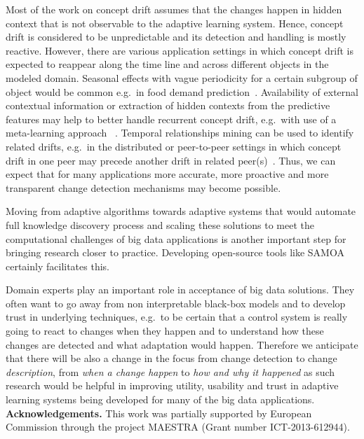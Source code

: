 \documentclass{llncs}
\begin{document}
Most of the work on concept drift assumes that the changes happen in hidden context that is not observable to the adaptive learning system. Hence, concept drift is considered to be unpredictable and its detection and handling is mostly reactive.
However, there are various application settings in which concept drift is expected to reappear along the time line and across different objects in the modeled domain. Seasonal effects with vague periodicity for a certain subgroup of object would be common e.g.\ in food demand prediction~\cite{Zliobaite11sligro}.
Availability of external contextual information or extraction of hidden contexts from the predictive features may help to better handle recurrent concept drift, e.g.\ with use of a meta-learning approach ~\cite{GamaK11}. Temporal relationships mining can be used to identify related drifts, e.g.\ in the distributed or peer-to-peer settings in which concept drift in one peer may precede another drift in related peer(s)~\cite{Ang2013}.
Thus, we can expect that for many applications more accurate, more proactive and more transparent change detection mechanisms may become possible.


Moving from adaptive algorithms towards adaptive systems that would automate full knowledge discovery process and scaling these solutions to meet the computational challenges of big data applications is another important step for bringing research closer to practice. Developing open-source tools like SAMOA~\cite{JMLR:v16:morales15a} certainly facilitates this.

Domain experts play an important role in acceptance of big data solutions. They often want to go away from non interpretable black-box models and to develop trust in underlying techniques, e.g.\ to be certain that a control system is really going to react to changes when they happen and to understand how these changes are detected and what adaptation would happen.
Therefore we anticipate that there will be also a change in the focus from change detection to change {\em description}, from {\em when a change happen} to {\em how and why it happened} as such research would be helpful in improving utility, usability and trust in adaptive learning systems being developed for many of the big data applications.\\


\textbf{Acknowledgements.} This work was partially supported by European Commission through the project MAESTRA (Grant number ICT-2013-612944).





%
\end{document}
